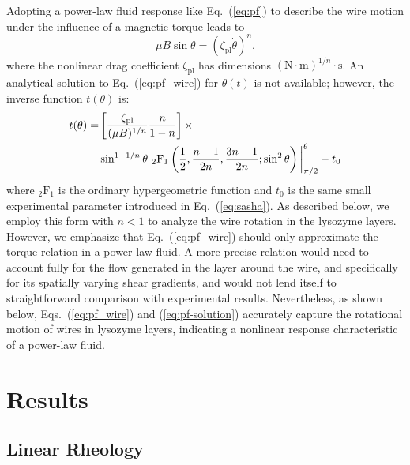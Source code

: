 Adopting a power-law fluid response like Eq.~(\ref{eq:pf}) to describe the wire motion under the influence of a magnetic torque leads to
\begin{equation}
  \mu B \sin\theta = (\zeta_{\text{pl}} \dot{\theta})^n.
  \label{eq:pf_wire}
\end{equation}
\noindent where the nonlinear drag coefficient $\zeta_{\text{pl}}$ has dimensions $(\text{N}\cdot\text{m})^{1/n}\cdot\text{s}$. An analytical solution to Eq.~(\ref{eq:pf_wire}) for $\theta(t)$ is not available; however, the inverse function $t(\theta)$ is:
\begin{align}
\label{eq:pf-solution}
  t(\theta) =&\left[\frac{\zeta_{\text{pl}}}{(\mu B)^{1/n}}\frac{n}{1-n}\right]\times\\ \notag
      &\sin^{1 - 1/n}\theta\ _2\text{F}_1\left(\frac{1}{2}, \frac{n-1}{2n}, \frac{3n-1}{2n}; \sin^2 \theta\right)\bigg\vert^{\theta}_{\pi/2} - t_0
\end{align}
\noindent where $_2\text{F}_1$ is the ordinary hypergeometric function and $t_0$ is the same small experimental parameter introduced in Eq.~(\ref{eq:sasha}).  As described below, we employ this form with $n < 1$ to analyze the wire rotation in the lysozyme layers.  However, we emphasize that Eq.~(\ref{eq:pf_wire}) should only approximate the torque relation in a power-law fluid.  A more precise relation would need to account fully for the flow generated in the layer around the wire, and specifically for its spatially varying shear gradients, and would not lend itself to straightforward comparison with experimental results.  Nevertheless, as shown below, Eqs.~(\ref{eq:pf_wire}) and (\ref{eq:pf-solution}) accurately capture the rotational motion of wires in lysozyme layers, indicating a nonlinear response characteristic of a power-law fluid.  


\section{\label{sec:results}Results}

\subsection{\label{sec:linear}Linear Rheology}

